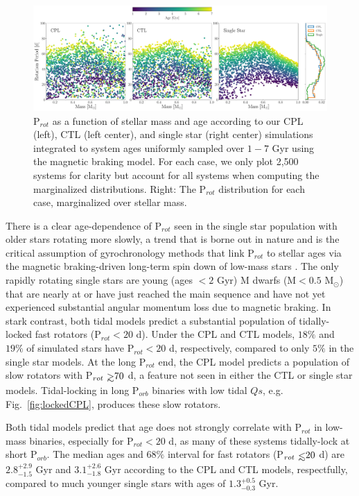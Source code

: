 \documentclass[twocolumn]{aastex61}
\def\gsim{~\rlap{$>$}{\lower 1.0ex\hbox{$\sim$}}}
\def\lsim{~\rlap{$<$}{\lower 1.0ex\hbox{$\sim$}}}
\begin{document}
\begin{figure}[t]
	\includegraphics[width=\textwidth]{../Plots/protDist.pdf}
   \caption{P$_{rot}$ as a function of stellar mass and age according to our CPL (left), CTL (left center), and single star (right center) simulations integrated to system ages uniformly sampled over $1-7$ Gyr using the \citet{Matt2015} magnetic braking model. For each case, we only plot 2,500 systems for clarity but account for all systems when computing the marginalized distributions. Right: The P$_{rot}$ distribution for each case, marginalized over stellar mass.}%
    \label{fig:protDist}%
\end{figure}

There is a clear age-dependence of P$_{rot}$ seen in the single star population with older stars rotating more slowly, a trend that is borne out in nature and is the critical assumption of gyrochronology methods that link P$_{rot}$ to stellar ages via the magnetic braking-driven long-term spin down of low-mass stars \citep[e.g.][]{Skumanich1972,Barnes2003,Barnes2007,Mamajek2008,Barnes2010,Meibom2015}. The only rapidly rotating single stars are young (ages $< 2$ Gyr) M dwarfs (M$ < 0.5$ M$_{\odot}$) that are nearly at or have just reached the main sequence and have not yet experienced substantial angular momentum loss due to magnetic braking.  In stark contrast, both tidal models predict a substantial population of tidally-locked fast rotators (P$_{rot} < 20$ d). Under the CPL and CTL models, $18\%$ and $19\%$ of simulated stars have P$_{rot} < 20 $ d, respectively, compared to only $5\%$ in the single star models.  At the long P$_{rot}$ end, the CPL model predicts a population of slow rotators with P$_{rot} \gsim 70$ d, a feature not seen in either the CTL or single star models.  Tidal-locking in long P$_{orb}$ binaries with low tidal $Qs$, e.g. Fig.~\ref{fig:lockedCPL}, produces these slow rotators.

Both tidal models predict that age does not strongly correlate with P$_{rot}$ in low-mass binaries, especially for P$_{rot} < 20 $ d, as many of these systems tidally-lock at short P$_{orb}$. The median ages and $68\%$ interval for fast rotators (P$_{rot} \lsim 20$ d) are $2.8^{+2.9}_{-1.5}$ Gyr and $3.1^{+2.6}_{-1.8}$ Gyr according to the CPL and CTL models, respectfully, compared to much younger single stars with ages of $1.3^{+0.5}_{-0.3}$ Gyr.   
\end{document}
